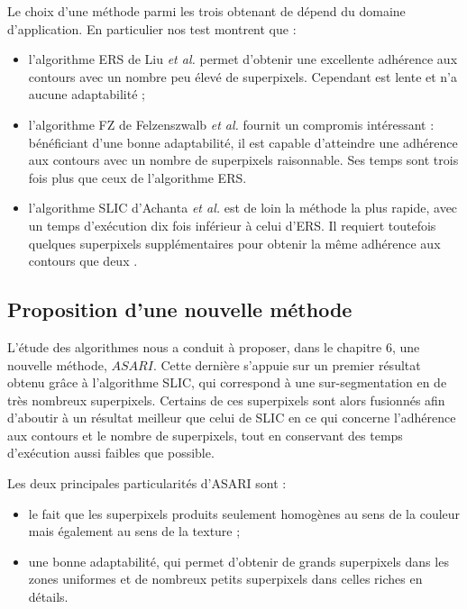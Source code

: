 Le choix d'une méthode parmi les trois obtenant de  dépend du domaine d'application. En particulier nos test\modif{,} montrent que :
\begin{itemize}
\item l'algorithme ERS de Liu \textit{et al.} \cite{liu2011entropy} permet d'obtenir une excellente adhérence aux contours avec un nombre peu élevé de superpixels. Cependant est lente et n'a aucune adaptabilité ;
\item l'algorithme FZ de Felzenszwalb \textit{et al.} \cite{felzenszwalb2004efficient} fournit un compromis intéressant : bénéficiant d'une bonne adaptabilité, il est capable d'atteindre une adhérence aux contours  avec un nombre de superpixels raisonnable. Ses temps  sont trois fois plus  que ceux de l'algorithme ERS. 
\item l'algorithme SLIC d'Achanta \textit{et al.} \cite{achanta2012slic} est de loin la méthode la plus rapide, avec un temps d'exécution dix fois inférieur à celui d'ERS. Il requiert toutefois quelques superpixels supplémentaires pour obtenir la même adhérence aux contours que  deux . 
\end{itemize}

\subsection{Proposition d'une nouvelle méthode}

L'étude des algorithmes  nous a conduit à proposer, dans le chapitre 6, une nouvelle méthode, $ASARI$. Cette dernière s'appuie sur un premier résultat obtenu grâce à l'algorithme SLIC, qui correspond à une sur-segmentation en de très nombreux superpixels. Certains de ces superpixels sont alors fusionnés afin d'aboutir à un résultat meilleur que celui de SLIC en ce qui concerne l'adhérence aux contours et le nombre de superpixels, tout en conservant des temps d'exécution aussi faibles que possible. 

Les deux principales particularités d'ASARI sont :
\begin{itemize}
\item le fait que les superpixels produits  seulement homogènes au sens de la couleur mais également au sens de la texture ;
\item une bonne adaptabilité, qui permet d'obtenir de grands superpixels dans les zones uniformes et de nombreux petits superpixels dans celles riches en détails. 
\end{itemize}


